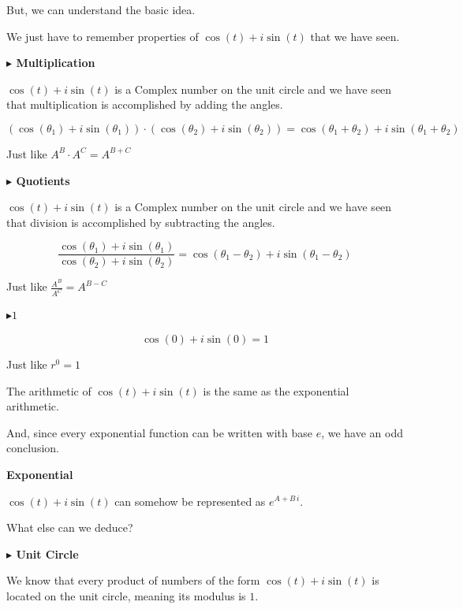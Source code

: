 \documentclass{ximera}
\begin{document}
But, we can understand the basic idea. 


We just have to remember properties of $\cos(t) + i \sin(t)$ that we have seen.




\textbf{$\blacktriangleright$ Multiplication}


$\cos(t) + i \sin(t)$ is a Complex number on the unit circle and we have seen that multiplication is accomplished by adding the angles.



\[ (\cos(\theta_1) + i \sin(\theta_1)) \cdot (\cos(\theta_2) + i \sin(\theta_2))  = \cos(\theta_1 + \theta_2) + i \sin(\theta_1 + \theta_2) \]


Just like $A^B \cdot A^C = A^{B+C}$




\textbf{$\blacktriangleright$ Quotients}


$\cos(t) + i \sin(t)$ is a Complex number on the unit circle and we have seen that division is accomplished by subtracting the angles.


\[  \frac{\cos(\theta_1) + i \sin(\theta_1)}{\cos(\theta_2) + i \sin(\theta_2)} = \cos(\theta_1 - \theta_2) + i \sin(\theta_1 - \theta_2) \]


Just like $\frac{A^B}{A^C} = A^{B-C}$





\textbf{$\blacktriangleright 1$ }

\[  \cos(0) + i \sin(0)  = 1\]


Just like $r^0 = 1$


The arithmetic of $\cos(t) + i \sin(t)$  is the same as the exponential arithmetic.

And, since every exponential function can be written with base $e$, we have an odd conclusion.


\begin{conclusion} \textbf{\textcolor{green!25!black}{Exponential}}

$\cos(t) + i \sin(t)$ can somehow be represented as $e^{A + B \, i}$.


\end{conclusion}



What else can we deduce?


\textbf{$\blacktriangleright$ Unit Circle}


We know that every product of numbers of the form $\cos(t) + i \sin(t)$ is located on the unit circle, meaning its modulus is $1$.
\end{document}
